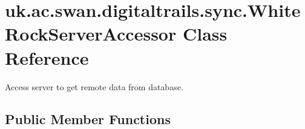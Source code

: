 \hypertarget{classuk_1_1ac_1_1swan_1_1digitaltrails_1_1sync_1_1_white_rock_server_accessor}{\section{uk.\+ac.\+swan.\+digitaltrails.\+sync.\+White\+Rock\+Server\+Accessor Class Reference}
\label{classuk_1_1ac_1_1swan_1_1digitaltrails_1_1sync_1_1_white_rock_server_accessor}
}


Access server to get remote data from database.  


\subsection*{Public Member Functions}
